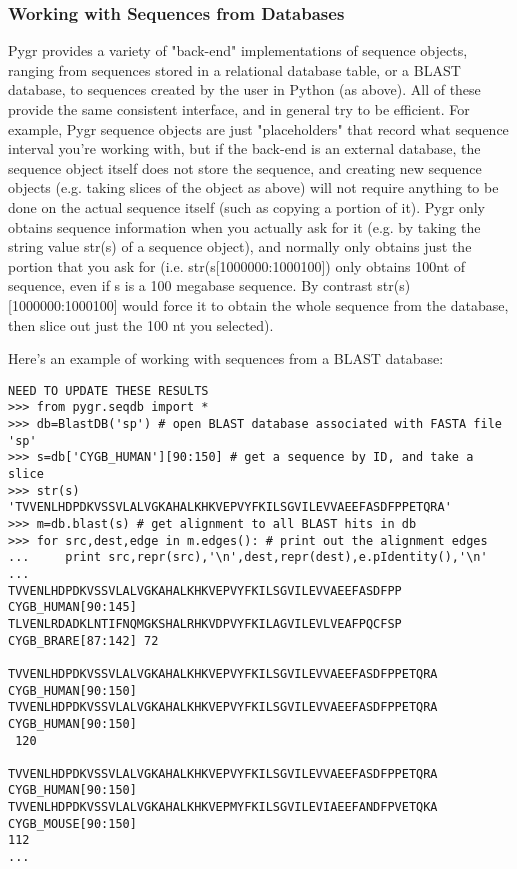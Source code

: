 \documentclass{howto}
\begin{document}
\subsubsection{Working with Sequences from Databases}

Pygr provides a variety of "back-end" implementations of sequence objects, ranging from sequences stored in a relational database table, or a BLAST database, to sequences created by the user in Python (as above).  All of these provide the same consistent interface, and in general try to be efficient.  For example, Pygr sequence objects are just "placeholders" that record what sequence interval you're working with, but if the back-end is an external database, the sequence object itself does not store the sequence, and creating new sequence objects (e.g. taking slices of the object as above) will not require anything to be done on the actual sequence itself (such as copying a portion of it).  Pygr only obtains sequence information when you actually ask for it (e.g. by taking the string value str(s) of a sequence object), and normally only obtains just the portion that you ask for (i.e. str(s[1000000:1000100]) only obtains 100nt of sequence, even if s is a 100 megabase sequence.  By contrast str(s)[1000000:1000100] would force it to obtain the whole sequence from the database, then slice out just the 100 nt you selected). 

Here's an example of working with sequences from a BLAST database:

\begin{verbatim}
NEED TO UPDATE THESE RESULTS
>>> from pygr.seqdb import *
>>> db=BlastDB('sp') # open BLAST database associated with FASTA file 'sp'
>>> s=db['CYGB_HUMAN'][90:150] # get a sequence by ID, and take a slice
>>> str(s)
'TVVENLHDPDKVSSVLALVGKAHALKHKVEPVYFKILSGVILEVVAEEFASDFPPETQRA'
>>> m=db.blast(s) # get alignment to all BLAST hits in db
>>> for src,dest,edge in m.edges(): # print out the alignment edges
...     print src,repr(src),'\n',dest,repr(dest),e.pIdentity(),'\n'
... 
TVVENLHDPDKVSSVLALVGKAHALKHKVEPVYFKILSGVILEVVAEEFASDFPP CYGB_HUMAN[90:145] 
TLVENLRDADKLNTIFNQMGKSHALRHKVDPVYFKILAGVILEVLVEAFPQCFSP CYGB_BRARE[87:142] 72

TVVENLHDPDKVSSVLALVGKAHALKHKVEPVYFKILSGVILEVVAEEFASDFPPETQRA CYGB_HUMAN[90:150] 
TVVENLHDPDKVSSVLALVGKAHALKHKVEPVYFKILSGVILEVVAEEFASDFPPETQRA CYGB_HUMAN[90:150]
 120

TVVENLHDPDKVSSVLALVGKAHALKHKVEPVYFKILSGVILEVVAEEFASDFPPETQRA CYGB_HUMAN[90:150] 
TVVENLHDPDKVSSVLALVGKAHALKHKVEPMYFKILSGVILEVIAEEFANDFPVETQKA CYGB_MOUSE[90:150]
112 
...
\end{verbatim}
\end{document}

